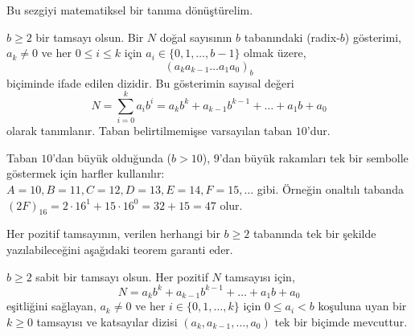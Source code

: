 Bu sezgiyi matematiksel bir tanıma dönüştürelim.

\begin{definition}
$b \ge 2$ bir tamsayı olsun. Bir $N$ doğal sayısının $b$ tabanındaki (radix-$b$) gösterimi, $a_k \ne 0$ ve her $0 \le i \le k$ için $a_i \in \{0, 1, \dots, b-1\}$ olmak üzere,
\[
(a_k a_{k-1} \dots a_1 a_0)_b
\]
biçiminde ifade edilen dizidir. Bu gösterimin sayısal değeri
\[
N = \sum_{i=0}^{k} a_i b^i = a_k b^k + a_{k-1} b^{k-1} + \dots + a_1 b + a_0
\]
olarak tanımlanır. Taban belirtilmemişse varsayılan taban $10$'dur.
\end{definition}

Taban $10$'dan büyük olduğunda ($b > 10$), $9$'dan büyük rakamları tek bir sembolle göstermek için harfler kullanılır: $A=10, B=11, C=12, D=13, E=14, F=15, \dots$ gibi. Örneğin onaltılı tabanda $(2F)_{16} = 2 \cdot 16^1 + 15 \cdot 16^0 = 32 + 15 = 47$ olur.

Her pozitif tamsayının, verilen herhangi bir $b \ge 2$ tabanında tek bir şekilde yazılabileceğini aşağıdaki teorem garanti eder.

\begin{theorem}
$b \ge 2$ sabit bir tamsayı olsun. Her pozitif $N$ tamsayısı için,
\[
N = a_k b^k + a_{k-1} b^{k-1} + \dots + a_1 b + a_0
\]
eşitliğini sağlayan, $a_k \ne 0$ ve her $i \in \{0, 1, \dots, k\}$ için $0 \le a_i < b$ koşuluna uyan bir $k \ge 0$ tamsayısı ve katsayılar dizisi $(a_k, a_{k-1}, \dots, a_0)$ tek bir biçimde mevcuttur.
\end{theorem}

